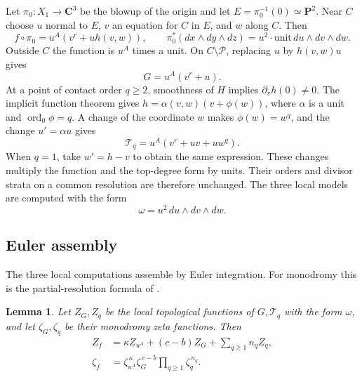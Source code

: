 \documentclass[11pt]{article}
\numberwithin{equation}{section}
\newtheorem{lemma}[theorem]{Lemma}
\theoremstyle{definition}
\theoremstyle{remark}
\newcommand{\CC}{\mathbf C}
\newcommand{\PP}{\mathbf P}
\DeclareMathOperator{\ord}{ord}
\begin{document}
Let $\pi_0:X_1\to\CC^3$ be the blowup of the origin and let
$E=\pi_0^{-1}(0)\simeq\PP^2$. Near $C$ choose $u$ normal to $E$,
$v$ an equation for $C$ in $E$, and $w$ along $C$. Then
\begin{equation}\label{eq:blowup-equation}
 f\circ\pi_0=u^A(v^r+u h(v,w)),\qquad
 \pi_0^*(dx\wedge dy\wedge dz)
   =u^2\cdot\text{unit}\,du\wedge dv\wedge dw.
\end{equation}
Outside $C$ the function is $u^A$ times a unit. On
$C\setminus\mathcal P$, replacing $u$ by $h(v,w)u$ gives
\[
 G=u^A(v^r+u).
\]
At a point of contact order $q\ge2$, smoothness of $H$ implies
$\partial_v h(0)\ne0$. The implicit function theorem gives
$h=\alpha(v,w)(v+\phi(w))$, where $\alpha$ is a unit and
$\ord_0\phi=q$. A change of the coordinate $w$ makes
$\phi(w)=w^q$, and the change $u'=\alpha u$ gives
\begin{equation}\label{eq:tangency-model}
 \mathcal T_q=u^A(v^r+uv+uw^q).
\end{equation}
When $q=1$, take $w'=h-v$ to obtain the same expression.
These changes multiply the function and the top-degree form by
units. Their orders and divisor strata on a common resolution
are therefore unchanged. The three local models are computed
with the form
\[
 \omega=u^2\,du\wedge dv\wedge dw.
\]

\subsection{Euler assembly}

The three local computations assemble by Euler integration.
For monodromy this is the partial-resolution formula of
\cite[Theorem~1 and Corollary~1]{GLM97}.

\begin{lemma}\label{lem:assembly}
Let $Z_G,Z_q$ be the local topological functions of $G,\mathcal T_q$
with the form $\omega$, and let $\zeta_G,\zeta_q$ be their
monodromy zeta functions. Then
\begin{align}
 Z_f&=\kappa Z_{u^A}+(c-b)Z_G+\sum_{q\ge1}n_qZ_q,
       \label{eq:assembly-z}\\
 \zeta_f&=\zeta_{u^A}^{\,\kappa}
            \zeta_G^{\,c-b}\prod_{q\ge1}\zeta_q^{\,n_q}.
       \label{eq:assembly-zeta}
\end{align}
\end{lemma}
\end{document}
